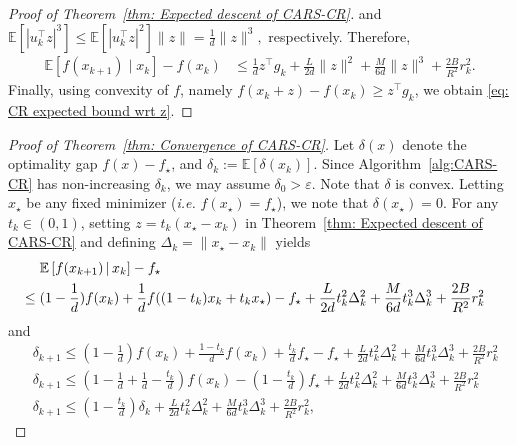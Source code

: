 \begin{proof}[Proof of Theorem~\ref{thm: Expected descent of CARS-CR}]
    and
    $
        \mathbb{E}\left[|u_k^{\top} z |^3\right]
        \leq \mathbb{E}\left[|u_k^{\top} z |^2\right]\|z\| = \frac{1}{d}\|z\|^3,
    $
    respectively.
    Therefore,
    \begin{align}\label{eq: CR expected descent in z involving g and H}
        \mathbb{E}\left[ f(x_{k+1}) \mid x_k \right] - f(x_k)
         & \leq \frac{1}{d}z^{\top}g_k
        + \frac{L}{2d}\|z\|^2 + \frac{M}{6d}\|z\|^3 + \frac{2B}{R^2}r_k^2.
    \end{align}
    Finally, using convexity of $f$, namely $f(x_k + z)-f(x_k) \geq z^{\top}g_k$, we obtain \eqref{eq: CR expected bound wrt z}.
\end{proof}

\begin{proof}[Proof of Theorem~\ref{thm: Convergence of CARS-CR}]
    Let $\delta(x)$ denote the optimality gap $f(x) - f_\star$, and $\delta_k := \mathbb{E}[\delta(x_k)]$. Since Algorithm~\ref{alg:CARS-CR} has non-increasing $\delta_k$, we may assume $\delta_0 > \varepsilon$. Note that $\delta$ is convex. Letting $x_{\star}$ be any fixed minimizer ({\em i.e.} $f(x_{\star}) = f_{\star}$), we note that $\delta(x_\star) = 0$. For any $t_k \in (0, 1)$,  setting $z = t_k(x_\star - x_k)$ in Theorem~\ref{thm: Expected descent of CARS-CR} and defining $\Delta_k = \|x_\star - x_k\|$ yields
    \begin{align*}
         & \quad~\mathbb{E}\left[f(x_{k+1}) \,|\, x_k \right] - f_{\star} \cr
         & \leq  (1-\frac{1}{d})f(x_k) + \frac{1}{d}f((1-t_k)x_k + t_kx_{\star}) - f_{\star}
        + \frac{L}{2d} t_k^2 \Delta_k^2 + \frac{M}{6d} t_k^3 \Delta_k^3 + \frac{2B}{R^2} r_k^2
    \end{align*}
    and
    \begin{align}
         & \delta_{k+1} \leq (1-\frac{1}{d})f(x_k) +\frac{1-t_k}{d}f(x_k) + \frac{t_k}{d}f_{\star} - f_{\star}
        + \frac{L}{2d} t_k^2 \Delta_k^2 + \frac{M}{6d} t_k^3 \Delta_k^3 + \frac{2B}{R^2} r_k^2 \label{eq:Thm3-convexity}                                                                                                     \\
         & \delta_{k+1} \leq (1 - \frac{1}{d} + \frac{1}{d} - \frac{t_k}{d})f(x_k) - (1 - \frac{t_k}{d})f_{\star} + \frac{L}{2d} t_k^2 \Delta_k^2 + \frac{M}{6d} t_k^3 \Delta_k^3 + \frac{2B}{R^2} r_k^2 \label{eq:March-14} \\
         & \delta_{k+1} \leq (1-\frac{t_k}{d})\delta_k +  \frac{L}{2d} t_k^2 \Delta_k^2 + \frac{M}{6d} t_k^3 \Delta_k^3 + \frac{2B}{R^2} r_k^2 \label{eq: CR conv before telescoping},

\end{align}
\end{proof}
